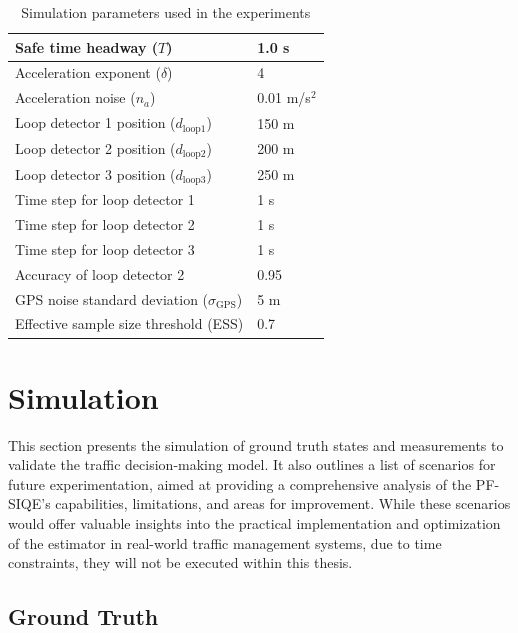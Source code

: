 \begin{table}[htbp]
\begin{tabular}{|l|l|}
        Safe time headway ($T$) & 1.0 s \\ \hline
        Acceleration exponent ($\delta$) & 4 \\ \hline
        Acceleration noise ($n_a$) & 0.01 m/s\(^2\) \\ \hline
        Loop detector 1 position ($d_{\text{loop1}}$) & 150 m \\ \hline
        Loop detector 2 position ($d_{\text{loop2}}$) & 200 m \\ \hline
        Loop detector 3 position ($d_{\text{loop3}}$) & 250 m \\ \hline
        Time step for loop detector 1 & 1 s \\ \hline
        Time step for loop detector 2 & 1 s \\ \hline
        Time step for loop detector 3 & 1 s \\ \hline
        Accuracy of loop detector 2 & 0.95 \\ \hline
        GPS noise standard deviation ($\sigma_{\text{GPS}}$) & 5 m \\ \hline
        Effective sample size threshold (ESS) & 0.7 \\ \hline
    \end{tabular}
    \caption{Simulation parameters used in the experiments}
    \label{tab:simulation_parameters}
\end{table}










\section{Simulation}\label{Experimental Scenarios}
This section presents the simulation of ground truth states and measurements to validate the traffic decision-making model. It also outlines a list of scenarios for future experimentation, aimed at providing a comprehensive analysis of the PF-SIQE's capabilities, limitations, and areas for improvement. While these scenarios would offer valuable insights into the practical implementation and optimization of the estimator in real-world traffic management systems, due to time constraints, they will not be executed within this thesis.

\subsection{Ground Truth}

